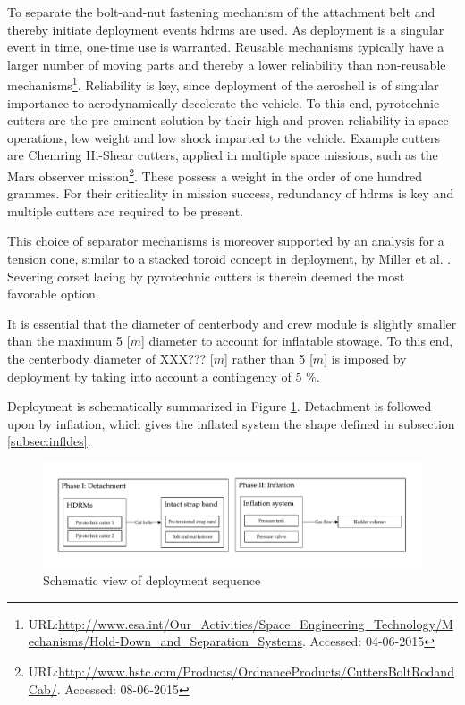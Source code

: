 To separate the bolt-and-nut fastening mechanism of the attachment belt and thereby initiate deployment events \glspl{hdrm} are used. As deployment is a singular event in time, one-time use is warranted. Reusable mechanisms typically have a larger number of moving parts and thereby a lower reliability than non-reusable mechanisms\footnote{URL:\url{http://www.esa.int/Our_Activities/Space_Engineering_Technology/Mechanisms/Hold-Down_and_Separation_Systems}. Accessed: 04-06-2015}. Reliability is key, since deployment of the aeroshell is of singular importance to aerodynamically decelerate the vehicle. To this end, pyrotechnic cutters are the pre-eminent solution by their high and proven reliability in space operations, low weight and low shock imparted to the vehicle. Example cutters are Chemring Hi-Shear cutters, applied in multiple space missions, such as the Mars observer mission\footnote{URL:\url{http://www.hstc.com/Products/OrdnanceProducts/CuttersBoltRodandCab/}. Accessed: 08-06-2015}. These possess a weight in the order of one hundred grammes. For their criticality in mission success, redundancy of \glspl{hdrm} is key and multiple cutters are required to be present. 

This choice of separator mechanisms is moreover supported by an analysis for a tension cone, similar to a stacked toroid concept in deployment, by Miller et al. \cite{Miller2014}. Severing corset lacing by pyrotechnic cutters is therein deemed the most favorable option.

It is essential that the diameter of centerbody and crew module is slightly smaller than the maximum 5 [$m$] diameter to account for inflatable stowage. To this end, the centerbody diameter of XXX??? [$m$] rather than 5 [$m$] is imposed by deployment by taking into account a contingency of 5 $\%$.

Deployment is schematically summarized in Figure \ref{fig:deplflow}. Detachment is followed upon by inflation, which gives the inflated system the shape defined in subsection \ref{subsec:infldes}.

\begin{figure}[h]
		\centering
		\includegraphics[width=1.0\textwidth]{./Figure/Structure/Deployment.pdf}
		\caption{Schematic view of deployment sequence}
		\label{fig:deplflow}
\end{figure}






